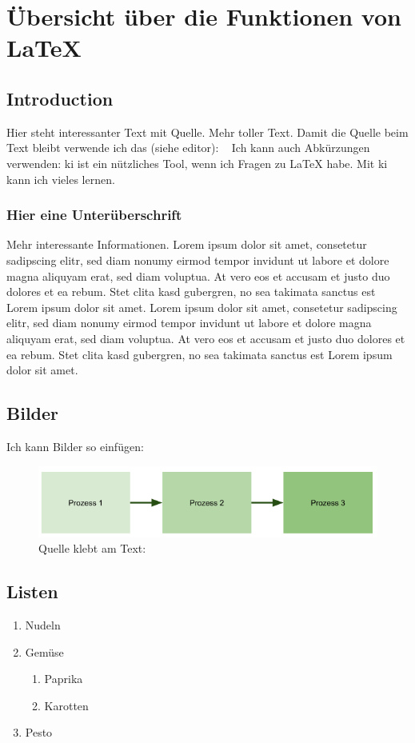 \chapter{Übersicht über die Funktionen von LaTeX}

\section{Introduction}
Hier steht interessanter Text mit Quelle. \cite{example_citation}  Mehr toller Text. Damit die Quelle beim Text bleibt verwende ich das (siehe editor): ~\cite{example_citation} 
Ich kann auch Abkürzungen verwenden: \ac{ki} ist ein nützliches Tool, wenn ich Fragen zu LaTeX habe. Mit \ac{ki} kann ich vieles lernen.

\subsection{Hier eine Unterüberschrift}
Mehr interessante Informationen. Lorem ipsum dolor sit amet, consetetur sadipscing elitr, sed diam nonumy eirmod tempor invidunt ut labore et dolore magna aliquyam erat, sed diam voluptua. At vero eos et accusam et justo duo dolores et ea rebum. Stet clita kasd gubergren, no sea takimata sanctus est Lorem ipsum dolor sit amet. Lorem ipsum dolor sit amet, consetetur sadipscing elitr, sed diam nonumy eirmod tempor invidunt ut labore et dolore magna aliquyam erat, sed diam voluptua. At vero eos et accusam et justo duo dolores et ea rebum. Stet clita kasd gubergren, no sea takimata sanctus est Lorem ipsum dolor sit amet. 

\section{Bilder}

Ich kann Bilder so einfügen:
\begin{figure}[h]
    \centering
    \includegraphics[width=0.5\linewidth]{figures/Beispiel_Bild.png}
    \caption{Quelle klebt am Text: ~\cite{example_citation}}
    \label{fig:Beipsielbild}
\end{figure}



\section{Listen}
\begin{enumerate}[label=\arabic*.]
    \item Nudeln
    \item Gemüse
    \begin{enumerate}[label=\arabic{enumi}.\arabic*.]
        \item Paprika
        \item Karotten
    \end{enumerate}
    \item Pesto
\end{enumerate}

